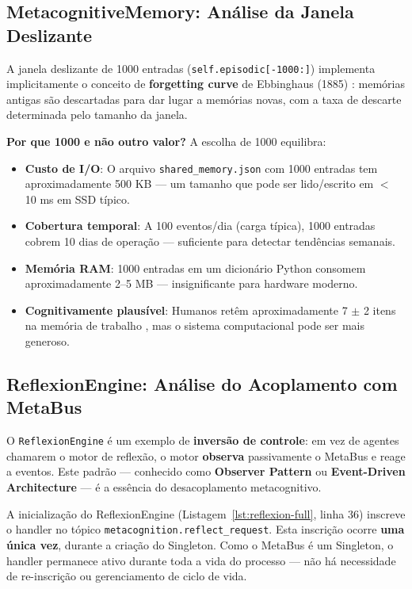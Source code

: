 \subsection{MetacognitiveMemory: Análise da Janela Deslizante}

A janela deslizante de 1000 entradas (\texttt{self.episodic[-1000:]}) implementa implicitamente o conceito de \textbf{forgetting curve} de Ebbinghaus (1885) \cite{Ebbinghaus1885_Memory}: memórias antigas são descartadas para dar lugar a memórias novas, com a taxa de descarte determinada pelo tamanho da janela.

\textbf{Por que 1000 e não outro valor?} A escolha de 1000 equilibra:

\begin{itemize}
    \item \textbf{Custo de I/O}: O arquivo \texttt{shared\_memory.json} com 1000 entradas tem aproximadamente 500 KB — um tamanho que pode ser lido/escrito em $<$ 10 ms em SSD típico.
    \item \textbf{Cobertura temporal}: A 100 eventos/dia (carga típica), 1000 entradas cobrem 10 dias de operação — suficiente para detectar tendências semanais.
    \item \textbf{Memória RAM}: 1000 entradas em um dicionário Python consomem aproximadamente 2--5 MB — insignificante para hardware moderno.
    \item \textbf{Cognitivamente plausível}: Humanos retêm aproximadamente 7 $\pm$ 2 itens na memória de trabalho \cite{Miller1956_Magical7}, mas o sistema computacional pode ser mais generoso.
\end{itemize}

\subsection{ReflexionEngine: Análise do Acoplamento com MetaBus}

O \texttt{ReflexionEngine} é um exemplo de \textbf{inversão de controle}: em vez de agentes chamarem o motor de reflexão, o motor \textbf{observa} passivamente o MetaBus e reage a eventos. Este padrão — conhecido como \textbf{Observer Pattern} ou \textbf{Event-Driven Architecture} — é a essência do desacoplamento metacognitivo.

A inicialização do ReflexionEngine (Listagem~\ref{lst:reflexion-full}, linha 36) inscreve o handler no tópico \texttt{metacognition.reflect\_request}. Esta inscrição ocorre \textbf{uma única vez}, durante a criação do Singleton. Como o MetaBus é um Singleton, o handler permanece ativo durante toda a vida do processo — não há necessidade de re-inscrição ou gerenciamento de ciclo de vida.

